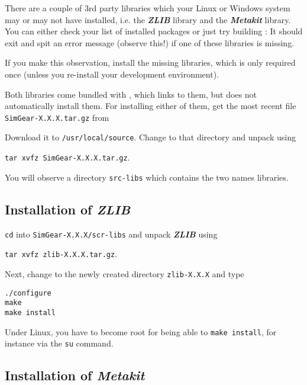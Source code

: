 There are a couple of 3rd party libraries which your Linux or Windows system may or may not have installed, i.e. the \textbf{\textit{ZLIB}} library and the \textbf{\textit{Metakit}} library. You can either check your list of installed packages or just try building \SimGear{}: It should exit and spit an error message (observe this!) if one of these libraries is missing.

If you make this observation, install the missing libraries, which is only required once (unless you re-install your development environment). 

Both libraries come bundled with \SimGear{}, which links to them, but does not automatically install them. For installing either of them, get the most recent file \texttt{SimGear-X.X.X.tar.gz} from
  \medskip

   \medskip

 \noindent
Download it to \texttt{/usr/local/source}. Change to that directory and unpack \SimGear{}
using

        \texttt{tar xvfz SimGear-X.X.X.tar.gz}.

You will observe a directory \texttt{src-libs} which contains the two names libraries. 

\subsection{Installation of \textbf{\textit{ZLIB}\label{zlibinstall}}}

\noindent
 \texttt{cd} into \texttt{SimGear-X.X.X/scr-libs} and unpack \textbf{\textit{ZLIB}} using
 \medskip
 
 \noindent
 				\texttt{tar xvfz zlib-X.X.X.tar.gz}.
 	\medskip

\noindent 				
 Next, change to the newly created directory \texttt{zlib-X.X.X} and type
 \medskip

 \noindent
        \texttt{./configure}\\
        \texttt{make}\\
        \texttt{make install}
 \medskip

 \noindent
 Under Linux, you have to become root for being able to \texttt{make install}, for instance via the \texttt{su} command. 
  
\subsection{Installation of \textbf{\textit{Metakit}\label{metakeitinstall}}}

